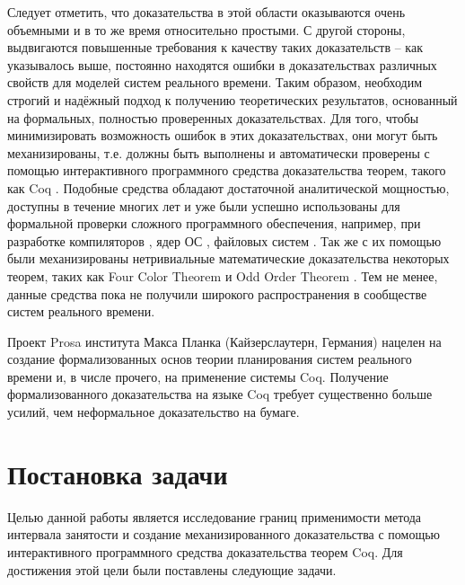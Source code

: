 \documentclass[14pt]{matmex-diploma-custom}
\begin{document}
 Следует отметить, что доказательства в этой области оказываются очень 
  объемными и в то же время относительно простыми. С другой стороны, выдвигаются повышенные требования 
  к качеству таких доказательств -- как указывалось выше, постоянно находятся ошибки 
  в доказательствах различных свойств  для моделей систем реального времени. 
  Таким образом, необходим строгий и надёжный подход к получению теоретических результатов, основанный
  на формальных, полностью проверенных доказательствах. Для того, чтобы минимизировать 
  возможность ошибок в этих доказательствах, они могут быть механизированы, 
  т.е. должны быть выполнены и автоматически 
  проверены с помощью интерактивного программного средства доказательства теорем, 
  такого как Coq \cite{Coq}. Подобные средства обладают достаточной аналитической 
  мощностью, доступны в течение многих лет и уже были успешно использованы для формальной
  проверки сложного программного обеспечения, например, при разработке компиляторов 
  \cite{leroy}, ядер ОС \cite{klein}, файловых систем \cite{chen:2}. Так же с их 
  помощью были механизированы нетривиальные математические доказательства некоторых 
  теорем, таких как Four Color Theorem \cite{gonthier:1} и Odd Order Theorem \cite{gonthier:2}.
  Тем не менее, данные средства пока не получили широкого распространения в сообществе 
  систем реального времени. 
  
Проект Prosa \cite{Prosa} института Макса Планка (Кайзерслаутерн, Германия) нацелен 
  на создание формализованных основ теории планирования систем реального 
  времени и, в числе прочего, на применение системы Coq. 
  Получение формализованного доказательства на языке Coq требует существенно больше
  усилий, чем неформальное доказательство на бумаге. 


\section*{Постановка задачи}
Целью данной работы является исследование границ применимости метода интервала занятости
  и создание механизированного доказательства с помощью интерактивного 
  программного средства доказательства теорем Coq. Для достижения этой цели были поставлены 
  следующие задачи.
\end{document}
